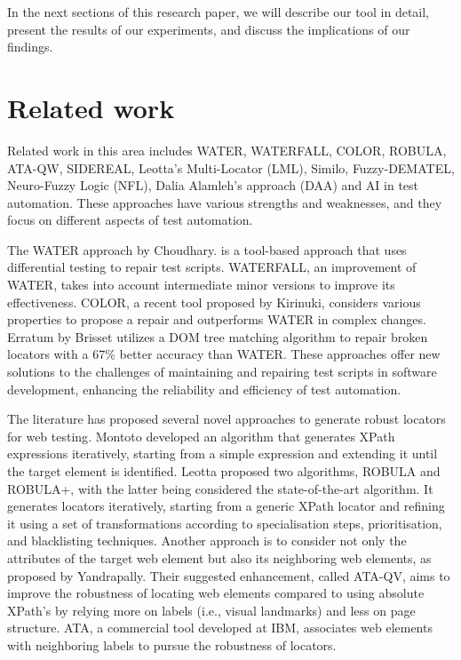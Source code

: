 \documentclass{article}
\begin{document}
In the next sections of this research paper, we will describe our tool in detail, present the results of our experiments, and discuss the implications of our findings.

\maketitle

\section{Related work}

Related work in this area includes WATER\cite{water}, WATERFALL\cite{waterfall}, COLOR\cite{color}, ROBULA\cite{robula}, ATA-QW\cite{ata}, SIDEREAL\cite{sidereal}, Leotta's Multi-Locator (LML)\cite{lml}, Similo\cite{similo}, Fuzzy-DEMATEL, Neuro-Fuzzy Logic (NFL), Dalia Alamleh's approach (DAA)\cite{fuzzy_ai_in_web_testing} and AI in test automation\cite{ai_in_test_auto}. These approaches have various strengths and weaknesses, and they focus on different aspects of test automation.

The WATER approach by Choudhary\cite{water}. is a tool-based approach that uses differential testing to repair test scripts. WATERFALL\cite{waterfall}, an improvement of WATER\cite{water}, takes into account intermediate minor versions to improve its effectiveness. COLOR, a recent tool proposed by Kirinuki\cite{color}, considers various properties to propose a repair and outperforms WATER\cite{water} in complex changes. Erratum by Brisset\cite{erratum} utilizes a DOM tree matching algorithm to repair broken locators with a 67\% better accuracy than WATER\cite{water}. These approaches offer new solutions to the challenges of maintaining and repairing test scripts in software development, enhancing the reliability and efficiency of test automation.

The literature has proposed several novel approaches to generate robust locators for web testing\cite{robust_locators, robula+}. Montoto\cite{montoto} developed an algorithm that generates XPath expressions iteratively, starting from a simple expression and extending it until the target element is identified. Leotta proposed two algorithms, ROBULA\cite{robula} and ROBULA+\cite{robula+}, with the latter being considered the state-of-the-art algorithm. It generates locators iteratively, starting from a generic XPath locator and refining it using a set of transformations according to specialisation steps, prioritisation, and blacklisting techniques. Another approach is to consider not only the attributes of the target web element but also its neighboring web elements, as proposed by Yandrapally\cite{yandrapally}. Their suggested enhancement, called ATA-QV\cite{ata}, aims to improve the robustness of locating web elements compared to using absolute XPath's by relying more on labels (i.e., visual landmarks) and less on page structure. ATA\cite{ata}, a commercial tool developed at IBM, associates web elements with neighboring labels to pursue the robustness of locators.
\end{document}
